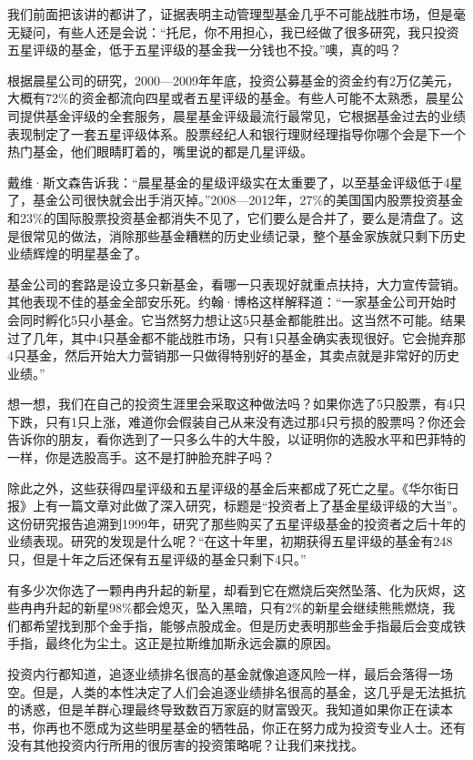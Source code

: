 我们前面把该讲的都讲了，证据表明主动管理型基金几乎不可能战胜市场，但是毫无疑问，有些人还是会说：“托尼，你不用担心，我已经做了很多研究，我只投资五星评级的基金，低于五星评级的基金我一分钱也不投。”噢，真的吗？

根据晨星公司的研究，2000—2009年年底，投资公募基金的资金约有2万亿美元，大概有72\%的资金都流向四星或者五星评级的基金。有些人可能不太熟悉，晨星公司提供基金评级的全套服务，晨星基金评级最流行最常见，它根据基金过去的业绩表现制定了一套五星评级体系。股票经纪人和银行理财经理指导你哪个会是下一个热门基金，他们眼睛盯着的，嘴里说的都是几星评级。

戴维·斯文森告诉我：“晨星基金的星级评级实在太重要了，以至基金评级低于4星了，基金公司很快就会出手消灭掉。”2008—2012年，27\%的美国国内股票投资基金和23\%的国际股票投资基金都消失不见了，它们要么是合并了，要么是清盘了。这是很常见的做法，消除那些基金糟糕的历史业绩记录，整个基金家族就只剩下历史业绩辉煌的明星基金了。

基金公司的套路是设立多只新基金，看哪一只表现好就重点扶持，大力宣传营销。其他表现不佳的基金全部安乐死。约翰·博格这样解释道：“一家基金公司开始时会同时孵化5只小基金。它当然努力想让这5只基金都能胜出。这当然不可能。结果过了几年，其中4只基金都不能战胜市场，只有1只基金确实表现很好。它会抛弃那4只基金，然后开始大力营销那一只做得特别好的基金，其卖点就是非常好的历史业绩。”

想一想，我们在自己的投资生涯里会采取这种做法吗？如果你选了5只股票，有4只下跌，只有1只上涨，难道你会假装自己从来没有选过那4只亏损的股票吗？你还会告诉你的朋友，看你选到了一只多么牛的大牛股，以证明你的选股水平和巴菲特的一样，你是选股高手。这不是打肿脸充胖子吗？

除此之外，这些获得四星评级和五星评级的基金后来都成了死亡之星。《华尔街日报》上有一篇文章对此做了深入研究，标题是“投资者上了基金星级评级的大当”。这份研究报告追溯到1999年，研究了那些购买了五星评级基金的投资者之后十年的业绩表现。研究的发现是什么呢？“在这十年里，初期获得五星评级的基金有248只，但是十年之后还保有五星评级的基金只剩下4只。”

有多少次你选了一颗冉冉升起的新星，却看到它在燃烧后突然坠落、化为灰烬，这些冉冉升起的新星98\%都会熄灭，坠入黑暗，只有2\%的新星会继续熊熊燃烧，我们都希望找到那个金手指，能够点股成金。但是历史表明那些金手指最后会变成铁手指，最终化为尘土。这正是拉斯维加斯永远会赢的原因。

投资内行都知道，追逐业绩排名很高的基金就像追逐风险一样，最后会落得一场空。但是，人类的本性决定了人们会追逐业绩排名很高的基金，这几乎是无法抵抗的诱惑，但是羊群心理最终导致数百万家庭的财富毁灭。我知道如果你正在读本书，你再也不愿成为这些明星基金的牺牲品，你正在努力成为投资专业人士。还有没有其他投资内行所用的很厉害的投资策略呢？让我们来找找。

